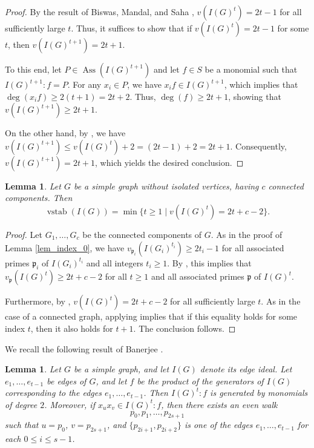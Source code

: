 \documentclass[12pt,reqno,twoside]{amsart}
\newtheorem{lem}[thm]{\bf Lemma}
\theoremstyle{definition}
\theoremstyle{plain}
\theoremstyle{remark}
\numberwithin{equation}{section}
\begin{document}
\begin{proof}
By the result of Biswas, Mandal, and Saha \cite{BMS}, $v(I(G)^t) = 2t-1$ for all sufficiently large $t$. Thus, it suffices to show that if $v(I(G)^t) = 2t-1$ for some $t$, then $v(I(G)^{t+1}) = 2t+1$. 

To this end, let $P \in \operatorname{Ass}(I(G)^{t+1})$ and let $f \in S$ be a monomial such that $I(G)^{t+1} : f = P$. For any $x_i \in P$, we have $x_i f \in I(G)^{t+1}$, which implies that $\deg(x_i f) \ge 2(t+1) = 2t+2$. Thus, $\deg(f) \ge 2t+1$, showing that $v(I(G)^{t+1}) \ge 2t+1$. 

On the other hand, by \cite[Theorem 4.3]{YHC}, we have $v(I(G)^{t+1}) \le v(I(G)^t) + 2 = (2t-1) + 2 = 2t+1$. Consequently, $v(I(G)^{t+1}) = 2t+1$, which yields the desired conclusion.
\end{proof}

\begin{lem}\label{lem_index_1} 
Let $G$ be a simple graph without isolated vertices, having $c$ connected components. Then 
\[
\operatorname{vstab}(I(G)) = \min \{t \ge 1 \mid v(I(G)^t) = 2t+c-2\}.
\]
\end{lem}

\begin{proof} 
Let $G_1, \ldots, G_c$ be the connected components of $G$. As in the proof of Lemma \ref{lem_index_0}, we have $v_{\mathfrak{p}_i}(I(G_i)^{t_i}) \ge 2t_i - 1$ for all associated primes $\mathfrak{p}_i$ of $I(G_i)^{t_i}$ and all integers $t_i \ge 1$. By \cite[Theorem 4.1]{FM}, this implies that $v_{\mathfrak{p}}(I(G)^t) \ge 2t+c-2$ for all $t \ge 1$ and all associated primes $\mathfrak{p}$ of $I(G)^t$. 

Furthermore, by \cite[Corollary 5.4]{FM}, $v(I(G)^t) = 2t + c - 2$ for all sufficiently large $t$. As in the case of a connected graph, applying \cite[Theorem 4.1]{YHC} implies that if this equality holds for some index $t$, then it also holds for $t+1$. The conclusion follows.
\end{proof}

We recall the following result of Banerjee \cite{B}.

\begin{lem}\label{lem_even}
Let $G$ be a simple graph, and let $I(G)$ denote its edge ideal. Let $e_1, \ldots, e_{t-1}$ be edges of $G$, and let $f$ be the product of the generators of $I(G)$ corresponding to the edges $e_1, \ldots, e_{t-1}$. Then $I(G)^t : f$ is generated by monomials of degree $2$. Moreover, if $x_u x_v \in I(G)^t : f$, then there exists an even walk
\[
p_0, p_1, \ldots, p_{2s+1}
\]
such that $u = p_0$, $v = p_{2s+1}$, and $\{p_{2i+1}, p_{2i+2}\}$ is one of the edges $e_1, \ldots, e_{t-1}$ for each $0 \le i \le s-1$.
\end{lem}
\end{document}
